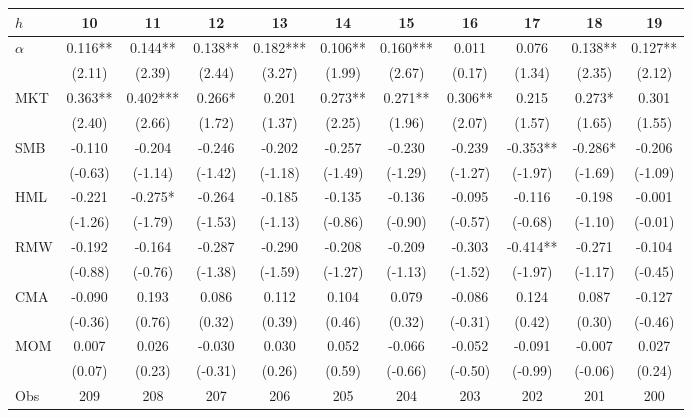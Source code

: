 \begin{tabular}{lcccccccccc}
\toprule
$h$ & 10 & 11 & 12 & 13 & 14 & 15 & 16 & 17 & 18 & 19 \\
\midrule
$\alpha$ & 0.116** & 0.144** & 0.138** & 0.182*** & 0.106** & 0.160*** & 0.011 & 0.076 & 0.138** & 0.127** \\
 & (2.11) & (2.39) & (2.44) & (3.27) & (1.99) & (2.67) & (0.17) & (1.34) & (2.35) & (2.12) \\
MKT & 0.363** & 0.402*** & 0.266* & 0.201 & 0.273** & 0.271** & 0.306** & 0.215 & 0.273* & 0.301 \\
 & (2.40) & (2.66) & (1.72) & (1.37) & (2.25) & (1.96) & (2.07) & (1.57) & (1.65) & (1.55) \\
SMB & -0.110 & -0.204 & -0.246 & -0.202 & -0.257 & -0.230 & -0.239 & -0.353** & -0.286* & -0.206 \\
 & (-0.63) & (-1.14) & (-1.42) & (-1.18) & (-1.49) & (-1.29) & (-1.27) & (-1.97) & (-1.69) & (-1.09) \\
HML & -0.221 & -0.275* & -0.264 & -0.185 & -0.135 & -0.136 & -0.095 & -0.116 & -0.198 & -0.001 \\
 & (-1.26) & (-1.79) & (-1.53) & (-1.13) & (-0.86) & (-0.90) & (-0.57) & (-0.68) & (-1.10) & (-0.01) \\
RMW & -0.192 & -0.164 & -0.287 & -0.290 & -0.208 & -0.209 & -0.303 & -0.414** & -0.271 & -0.104 \\
 & (-0.88) & (-0.76) & (-1.38) & (-1.59) & (-1.27) & (-1.13) & (-1.52) & (-1.97) & (-1.17) & (-0.45) \\
CMA & -0.090 & 0.193 & 0.086 & 0.112 & 0.104 & 0.079 & -0.086 & 0.124 & 0.087 & -0.127 \\
 & (-0.36) & (0.76) & (0.32) & (0.39) & (0.46) & (0.32) & (-0.31) & (0.42) & (0.30) & (-0.46) \\
MOM & 0.007 & 0.026 & -0.030 & 0.030 & 0.052 & -0.066 & -0.052 & -0.091 & -0.007 & 0.027 \\
 & (0.07) & (0.23) & (-0.31) & (0.26) & (0.59) & (-0.66) & (-0.50) & (-0.99) & (-0.06) & (0.24) \\
Obs & 209 & 208 & 207 & 206 & 205 & 204 & 203 & 202 & 201 & 200 \\
\bottomrule
\end{tabular}


